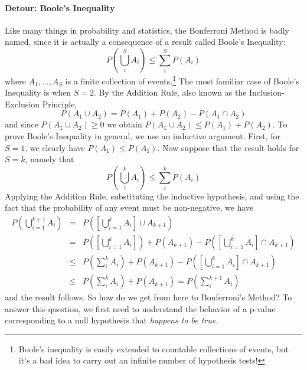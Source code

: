 \paragraph{Detour: Boole's Inequality}
Like many things in probability and statistics, the Bonferroni Method is badly named, since it is actually a consequence of a result called Boole's Inequality:
\begin{equation*}
  P\left( \bigcup_{i}^{S} A_i \right) \leq \sum_{i}^{S} P\left( A_{i} \right)
\end{equation*}
where $A_1, \hdots, A_S$ is a finite collection of events.\footnote{Boole's inequality is easily extended to countable collections of events, but it's a bad idea to carry out an infinite number of hypothesis tests!}
The most familiar case of Boole's Inequality is when $S=2$.
By the Addition Rule, also known as the Inclusion-Exclusion Principle, 
\begin{equation*}
  P(A_1\cup A_2) = P(A_1) + P(A_2) - P(A_1\cap A_2)
\end{equation*}
and since $P(A_1\cup A_2)\geq 0$ we obtain $P(A_1\cup A_2)\leq P(A_1) + P(A_2)$.
To prove Boole's Inequality in general, we use an inductive argument.
First, for $S=1$, we clearly have $P(A_1)\leq P(A_1)$.
Now suppose that the result holds for $S=k$, namely that
\begin{equation*}
  P\left( \bigcup_{i}^{k} A_i \right) \leq \sum_{i}^{k} P\left( A_{i} \right)
\end{equation*}
Applying the Addition Rule, substituting the inductive hypothesis, and using the fact that the probability of any event must be non-negative, we have
\begin{eqnarray*}
  P\left( \bigcup_{i=1}^{k+1} A_i \right) &=& P\left(\left[ \bigcup_{i=1}^{k} A_i\right] \cup A_{k+1} \right)\\
  &=& P\left(\left[ \bigcup_{i=1}^{k} A_i\right] \right) + P(A_{k+1}) - P\left(\left[ \bigcup_{i=1}^{k} A_i \right] \cap A_{k+1}  \right)\\
  &\leq& P\left( \sum_i^k A_i \right) + P(A_{k+1}) - P\left(\left[ \bigcup_{i=1}^{k} A_i \right] \cap A_{k+1}  \right)\\
  &\leq& P\left( \sum_i^k A_i \right) + P(A_{k+1}) = P\left( \sum_i^{k+1} A_i \right)
\end{eqnarray*}
and the result follows.
So how do we get from here to Bonferroni's Method?
To answer this question, we first need to understand the behavior of a p-value corresponding to a null hypothesis that \emph{happens to be true}.

